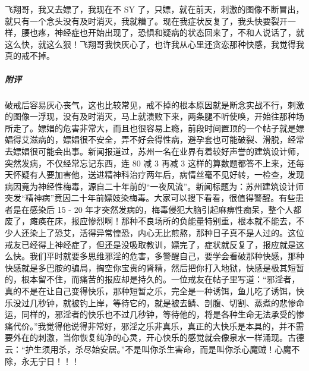 \begin{case}
    飞翔哥，我又去嫖了，我现在不 SY 了，只嫖，就在前天，刺激的图像不断冒出，就只有一个念头没有及时消灭，我就糟了。现在我症状反复了，我头快要裂开一样，腰也疼，神经症也开始出现了，恐惧和疑病的状态回来了，不和人说话了，就这么快，就这么狠！飞翔哥我快灰心了，也许我从心里还贪恋那种快感，我觉得我真的戒不掉。
    \subparagraph{附评} 破戒后容易灰心丧气，这也比较常见，戒不掉的根本原因就是断念实战不行，刺激的图像一浮现，没有及时消灭，马上就溃败下来，两条腿不听使唤，开始往那种场所走了。嫖娼的危害非常大，而且也很容易上瘾，前段时间置顶的一个帖子就是嫖娼得艾滋病的，嫖娼很不安全，弄不好会得性病，避孕套也可能破裂、滑脱，经常去嫖娼很可能会出事。新闻报道过，苏州一名在业界有着较好声誉的建筑设计师，突然发病，不仅经常忘记东西，连 80 减 3 再减 3 这样的算数题都答不上来，还每天怀疑有人要加害他，送进精神科治疗两年后，病情丝毫不见好转，一检查，发现病因竟为神经性梅毒，源自二十年前的“一夜风流”。新闻标题为：苏州建筑设计师突发“精神病”竟因二十年前嫖妓染梅毒。大家可以搜下看看，很值得警醒。有些患者是在感染后 15 - 20 年才突然发病的，梅毒侵犯大脑引起麻痹性痴呆，整个人都废了，瘫痪在床，报应惨烈啊！那种不良场所的负能量特别重，根本就不能去，不少人还染上了恐艾，活得异常惶恐，内心无比煎熬，那种日子真不是人过的。这位戒友已经得上神经症了，但还是没吸取教训，嫖完了，症状就反复了，报应就是这么快。我们平时就要多思维邪淫的危害，多警醒自己，要学会看破那种快感，那种快感就是多巴胺的骗局，掏空你宝贵的肾精，然后把你打入地狱，快感是极其短暂的，根本留不住，而痛苦的报应却是持久的。一位戒友在帖子里写道：“邪淫者，真的不是在让自己变得快乐，那种短暂之乐，完全是一种诱饵，鱼儿吃了诱饵，快乐没过几秒钟，就被钓上岸，等待它的，就是被去鳞、剖腹、切割、蒸煮的悲惨命运，同样的，邪淫者的快乐也不过几秒钟，等待他的，将是各种生命无法承受的惨痛代价。”我觉得他说得非常好，邪淫之乐非真乐，真正的大快乐是本具的，并不需要外在的刺激，当你恢复纯净的心灵，开心快乐的感觉就会像泉水一样涌现。古德云：“护生须用杀，杀尽始安居。”不是叫你杀生害命，而是叫你杀心魔贼！心魔不除，永无宁日！！！
\end{case}


